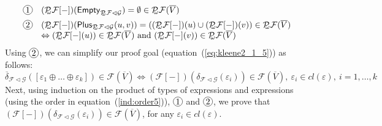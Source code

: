 \documentclass{LMCS}
\def\pow{{\mathcal P_{\!\!\!\omega}}}
\newcommand\E\varepsilon
\newcommand\Plus{\mathsf{Plus}}
\newcommand\Empty{\mathsf{Empty}}
\newcommand\G{\mathcal{G}}
\newcommand\F{\mathcal{F}}
\theoremstyle{definition}
\theoremstyle{plain}
\theoremstyle{plain}
\theoremstyle{plain}
\theoremstyle{plain}
\theoremstyle{definition}
\theoremstyle{definition}
\newcommand*\mycirc[1]{\begin{tikzpicture}[baseline=(C.base)]
    \node[draw,circle,inner sep=1pt](C) {#1};
  \end{tikzpicture}}
\begin{document}
\ \\
\fbox{$\F=\pow \F_1$} 
\[
\begin{array}{@{}clr}
\mycirc{1}& (\pow \F [-])(\Empty_{\pow \F\lhd \G}) = \emptyset
 \in \pow \F(\overline
V)\\[1.2ex]
\mycirc{2}& (\pow \F [-])(\Plus_{\pow \F\lhd
\G}(u,v))= 
((\pow \F [-]) (u) \cup (\pow \F [-])(v))\in \pow \F(\overline V) \\ &
\Leftrightarrow (\pow \F [-] (u))\in \pow \F(\overline V)
\text{ and } (\pow \F [-] (v))\in \pow \F(\overline V) \end{array}
\]
Using $\mycirc{2}$, we can simplify our proof goal
(equation~(\ref{eq:kleene2_1_5})) as follows:
\[
\overline\delta_{\F\lhd
\G}([\E_1\oplus\ldots \oplus \E_k]) \in \F(\overline V)
\Leftrightarrow (\F[-])(\delta_{\F\lhd
\G}(\E_i)) \in \F(\overline V), \ \E_i\in \mathit{cl}(\E),\ i=1,\ldots,k
\]
Next, using induction on the product of types of expressions and expressions
(using the order in equation~(\ref{ind:order5})), $\mycirc 1$
and $\mycirc 2$, we prove that $(\F[-])(\delta_{\F\lhd
\G}(\E_i)) \in \F(\overline V)$, for any $\E_i\in \mathit{cl}(\E)$. 
\end{document}
